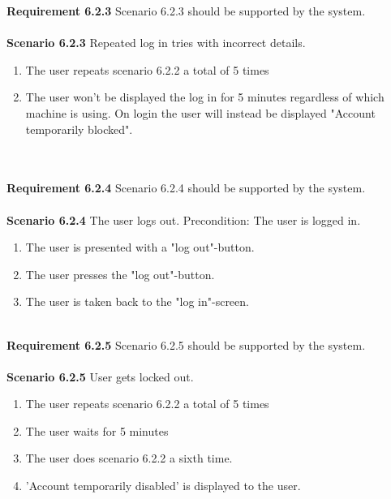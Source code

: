 \documentclass{article}
\begin{document}
\textbf{Requirement 6.2.3} Scenario 6.2.3 should be supported by the system.
\\ \\
\textbf{Scenario 6.2.3} Repeated log in tries with incorrect details.
\begin{enumerate}
    \item The user repeats scenario 6.2.2 a total of 5 times
    \item The user won't be displayed the log in for 5 minutes regardless of which machine is using. On login the user will instead be displayed "Account temporarily blocked".
\end{enumerate}
\\ \\
\textbf{Requirement 6.2.4} Scenario 6.2.4 should be supported by the system.
\\ \\
\textbf{Scenario 6.2.4} The user logs out. Precondition: The user is logged in.
\begin{enumerate}
    \item The user is presented with a "log out"-button.
    \item The user presses the "log out"-button.
    \item The user is taken back to the "log in"-screen.
\end{enumerate}
\mbox{}\\
\textbf{Requirement 6.2.5} Scenario 6.2.5 should be supported by the system.
\\ \\
\textbf{Scenario 6.2.5} User gets locked out.
\begin{enumerate}
    \item The user repeats scenario 6.2.2 a total of 5 times
    \item The user waits for 5 minutes
    \item The user does scenario 6.2.2 a sixth time.
    \item 'Account temporarily disabled' is displayed to the user.
\end{enumerate}
\end{document}
